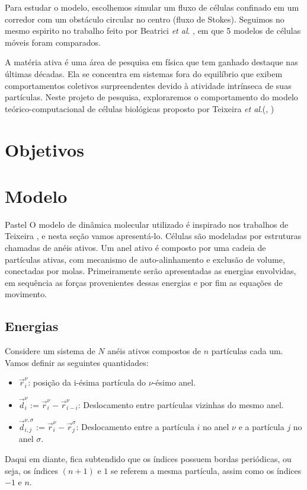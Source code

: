 \documentclass{article}
\theoremstyle{definition}
\def \quantity#1#2#3{\vec{#1}_{#2}^{#3}}
\def \quantityg#1#2#3#4#5{\vec{#1}_{#2, #3}^{#4, #5}}
\def \pos#1#2{\quantity{r}{#1}{#2}}
\def \desloc#1#2{\quantity{d}{#1}{#2}}
\begin{document}
Para estudar o modelo, escolhemos simular um fluxo de células confinado em um corredor com um obstáculo circular no centro (fluxo de Stokes). 
Seguimos no mesmo espirito no trabalho feito por Beatrici \textit{et al}. \cite{beatrici_comparing_2023}, em que 5 modelos de células móveis foram comparados.


A matéria ativa é uma área de pesquisa em física que tem ganhado destaque nas últimas décadas. Ela se concentra em sistemas fora do equilíbrio que exibem comportamentos coletivos surpreendentes devido à atividade intrínseca de suas partículas. Neste projeto de pesquisa, exploraremos o comportamento do modelo teórico-computacional de células biológicas proposto por Teixeira \textit{et al}.(\cite{teixeira_single_2021}, \cite{teixeira_segregation_2024})



\section{Objetivos}

\section{Modelo}
Pastel O modelo de dinâmica molecular utilizado é inspirado nos trabalhos de Teixeira \cite{teixeira_single_2021}, \cite{teixeira_segregation_2024} e nesta seção vamos apresentá-lo. Células são modeladas por estruturas chamadas de anéis ativos. Um anel ativo é composto por uma cadeia de partículas ativas, com mecanismo de auto-alinhamento e exclusão de volume, conectadas por molas. Primeiramente serão apresentadas as energias envolvidas, em sequência as forças provenientes dessas energias e por fim as equações de movimento.

\subsection{Energias}
Considere um sistema de $N$ anéis ativos compostos de $n$ partículas cada um. Vamos definir as seguintes quantidades:

\begin{itemize}
    \item $\pos{i}{\nu}$: posição da i-ésima partícula do $\nu$-ésimo anel.
    \item $\desloc{i}{\nu} := \pos{i}{\nu} - \pos{i-i}{\nu}$: Deslocamento entre partículas vizinhas do mesmo anel.
    \item $\quantityg{d}{i}{j}{\nu}{\sigma} := \pos{i}{\nu} - \pos{j}{\sigma}$: Deslocamento entre a partícula $i$ no anel $\nu$ e a partícula $j$ no anel $\sigma$.
\end{itemize}
Daqui em diante, fica subtendido que os índices possuem bordas periódicas, ou seja, os índices $(n+1)$ e $1$ se referem a mesma partícula, assim como os índices $-1$ e $n$.
\end{document}

